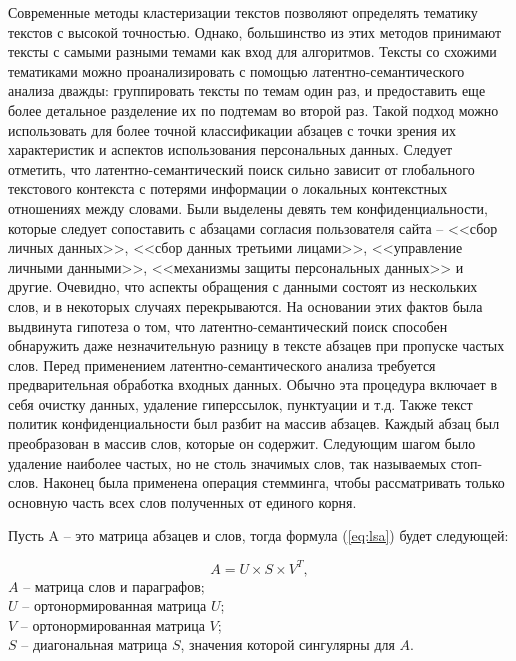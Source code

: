 \documentclass[../main]{subfiles}
\begin{document}
Современные методы кластеризации текстов позволяют определять тематику текстов с высокой точностью. Однако, большинство из этих методов принимают тексты с самыми разными темами как вход для алгоритмов. Тексты со схожими тематиками можно проанализировать с помощью ла\-тен\-тно-семантического анализа дважды: группировать тексты по темам один раз, и предоставить еще более детальное разделение их по подтемам во второй раз. Такой подход можно использовать для более точной классификации абзацев с точки зрения их характеристик и аспектов использования персональных данных. Следует отметить, что латентно-семантический поиск сильно зависит от глобального текстового контекста с потерями информации о локальных контекстных отношениях между словами. Были выделены девять тем конфиденциальности, которые следует сопоставить с абзацами согласия пользователя сайта -- <<сбор личных данных>>, <<сбор данных третьими лицами>>, <<управление личными данными>>, <<механизмы защиты персональных данных>> и другие. Очевидно, что аспекты обращения с данными состоят из нескольких слов, и в некоторых случаях перекрываются. На основании этих фактов была выдвинута гипотеза о том, что латентно-семантический поиск способен обнаружить даже незначительную разницу в тексте абзацев при пропуске частых слов. Перед применением латентно-семантического анализа требуется предварительная обработка входных данных. Обычно эта процедура включает в себя очистку данных, удаление гиперссылок, пунктуации и т.д. Также текст политик конфиденциальности был разбит на массив абзацев. Каждый абзац был преобразован в массив слов, которые он содержит. Следующим шагом было удаление наиболее частых, но не столь значимых слов, так называемых стоп-слов. Наконец была применена операция стемминга, чтобы рассматривать только основную часть всех слов полученных от единого корня.

Пусть A -- это матрица абзацев и слов, тогда формула (\ref{eq:lsa}) будет следующей:

\newpage
\begin{equation}
    \label{eq:lsa}
    A = U \times S \times V^T,
\end{equation}
$A$ -- матрица слов и параграфов;\\
\makebox[1.25cm]{\hfill}$U$ -- ортонормированная матрица $U$;\\
\makebox[1.25cm]{\hfill}$V$ -- ортонормированная матрица $V$;\\
\makebox[1.25cm]{\hfill}$S$ -- диагональная матрица $S$, значения которой сингулярны для $A$.
\end{document}
